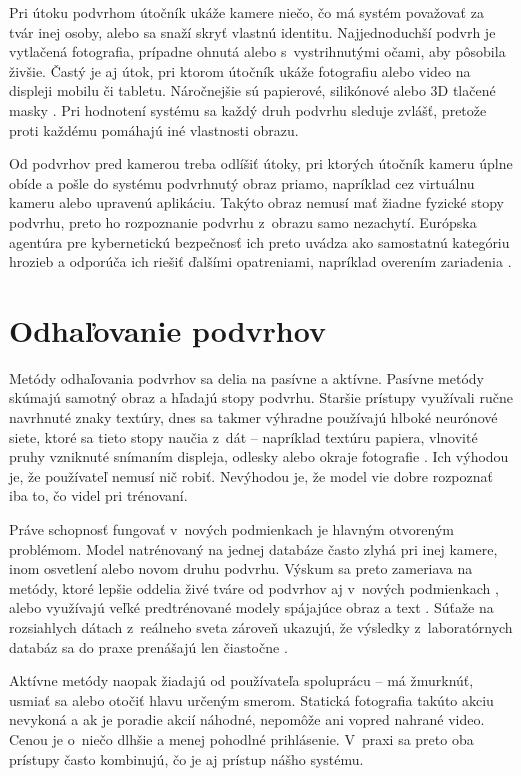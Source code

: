 \documentclass[12pt,a4paper,oneside]{report}
\begin{document}
Pri útoku podvrhom útočník ukáže kamere niečo, čo má systém považovať za tvár inej
osoby, alebo sa snaží skryť vlastnú identitu. Najjednoduchší podvrh je vytlačená
fotografia, prípadne ohnutá alebo s~vystrihnutými očami, aby pôsobila živšie. Častý je
aj útok, pri ktorom útočník ukáže fotografiu alebo video na displeji mobilu či tabletu.
Náročnejšie sú papierové, silikónové alebo 3D tlačené masky \cite{hernandezortega2023pad}.
Pri hodnotení systému sa každý druh podvrhu sleduje zvlášť, pretože proti každému pomáhajú
iné vlastnosti obrazu.

Od podvrhov pred kamerou treba odlíšiť útoky, pri ktorých útočník kameru úplne obíde
a pošle do systému podvrhnutý obraz priamo, napríklad cez virtuálnu kameru alebo
upravenú aplikáciu. Takýto obraz nemusí mať žiadne fyzické stopy podvrhu, preto ho
rozpoznanie podvrhu z~obrazu samo nezachytí. Európska agentúra pre kybernetickú
bezpečnosť ich preto uvádza ako samostatnú kategóriu hrozieb a odporúča ich riešiť
ďalšími opatreniami, napríklad overením zariadenia \cite{enisa2022remote}.

\section{Odhaľovanie podvrhov}

Metódy odhaľovania podvrhov sa delia na pasívne a aktívne. Pasívne metódy skúmajú samotný
obraz a hľadajú stopy podvrhu. Staršie prístupy využívali ručne navrhnuté znaky textúry,
dnes sa takmer výhradne používajú hlboké neurónové siete, ktoré sa tieto stopy naučia
z~dát -- napríklad textúru papiera, vlnovité pruhy vzniknuté snímaním displeja, odlesky
alebo okraje fotografie \cite{yu2023fassurvey}. Ich výhodou je, že používateľ nemusí nič
robiť. Nevýhodou je, že model vie dobre rozpoznať iba to, čo videl pri trénovaní.

Práve schopnosť fungovať v~nových podmienkach je hlavným otvoreným problémom. Model
natrénovaný na jednej databáze často zlyhá pri inej kamere, inom osvetlení alebo novom
druhu podvrhu. Výskum sa preto zameriava na metódy, ktoré lepšie oddelia živé tváre od
podvrhov aj v~nových podmienkach \cite{sun2023rethinking}, alebo využívajú veľké
predtrénované modely spájajúce obraz a text \cite{srivatsan2023flip}. Súťaže na
rozsiahlych dátach z~reálneho sveta zároveň ukazujú, že výsledky z~laboratórnych
databáz sa do praxe prenášajú len čiastočne \cite{wang2023wildfas}.

Aktívne metódy naopak žiadajú od používateľa spoluprácu -- má žmurknúť, usmiať sa alebo
otočiť hlavu určeným smerom. Statická fotografia takúto akciu nevykoná a ak je poradie
akcií náhodné, nepomôže ani vopred nahrané video. Cenou je o~niečo dlhšie a menej
pohodlné prihlásenie. V~praxi sa preto oba prístupy často kombinujú, čo je aj prístup
nášho systému.
\end{document}
